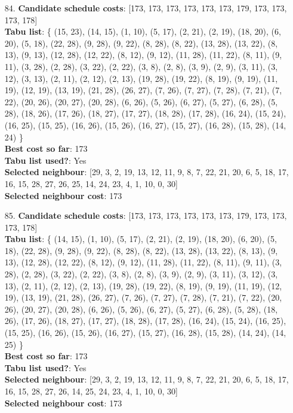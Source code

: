 \documentclass[fleqn]{article}
\begin{document}
\begin{itemize}
    \item[84.] \textbf{Candidate schedule costs}: [173, 173, 173, 173, 173, 173, 179, 173, 173, 173, 178] \\
    \textbf{Tabu list}: \{ (15, 23), (14, 15), (1, 10), (5, 17), (2, 21), (2, 19), (18, 20), (6, 20), (5, 18), (22, 28), (9, 28), (9, 22), (8, 28), (8, 22), (13, 28), (13, 22), (8, 13), (9, 13), (12, 28), (12, 22), (8, 12), (9, 12), (11, 28), (11, 22), (8, 11), (9, 11), (3, 28), (2, 28), (3, 22), (2, 22), (3, 8), (2, 8), (3, 9), (2, 9), (3, 11), (3, 12), (3, 13), (2, 11), (2, 12), (2, 13), (19, 28), (19, 22), (8, 19), (9, 19), (11, 19), (12, 19), (13, 19), (21, 28), (26, 27), (7, 26), (7, 27), (7, 28), (7, 21), (7, 22), (20, 26), (20, 27), (20, 28), (6, 26), (5, 26), (6, 27), (5, 27), (6, 28), (5, 28), (18, 26), (17, 26), (18, 27), (17, 27), (18, 28), (17, 28), (16, 24), (15, 24), (16, 25), (15, 25), (16, 26), (15, 26), (16, 27), (15, 27), (16, 28), (15, 28), (14, 24) \} \\
    \textbf{Best cost so far}: 173 \\
    \textbf{Tabu list used?}: Yes \\
    \textbf{Selected neighbour}: [29, 3, 2, 19, 13, 12, 11, 9, 8, 7, 22, 21, 20, 6, 5, 18, 17, 16, 15, 28, 27, 26, 25, 14, 24, 23, 4, 1, 10, 0, 30] \\
    \textbf{Selected neighbour cost}: 173
      

    \item[85.] \textbf{Candidate schedule costs}: [173, 173, 173, 173, 173, 173, 179, 173, 173, 173, 178] \\
    \textbf{Tabu list}: \{ (14, 15), (1, 10), (5, 17), (2, 21), (2, 19), (18, 20), (6, 20), (5, 18), (22, 28), (9, 28), (9, 22), (8, 28), (8, 22), (13, 28), (13, 22), (8, 13), (9, 13), (12, 28), (12, 22), (8, 12), (9, 12), (11, 28), (11, 22), (8, 11), (9, 11), (3, 28), (2, 28), (3, 22), (2, 22), (3, 8), (2, 8), (3, 9), (2, 9), (3, 11), (3, 12), (3, 13), (2, 11), (2, 12), (2, 13), (19, 28), (19, 22), (8, 19), (9, 19), (11, 19), (12, 19), (13, 19), (21, 28), (26, 27), (7, 26), (7, 27), (7, 28), (7, 21), (7, 22), (20, 26), (20, 27), (20, 28), (6, 26), (5, 26), (6, 27), (5, 27), (6, 28), (5, 28), (18, 26), (17, 26), (18, 27), (17, 27), (18, 28), (17, 28), (16, 24), (15, 24), (16, 25), (15, 25), (16, 26), (15, 26), (16, 27), (15, 27), (16, 28), (15, 28), (14, 24), (14, 25) \} \\
    \textbf{Best cost so far}: 173 \\
    \textbf{Tabu list used?}: Yes \\
    \textbf{Selected neighbour}: [29, 3, 2, 19, 13, 12, 11, 9, 8, 7, 22, 21, 20, 6, 5, 18, 17, 16, 15, 28, 27, 26, 14, 25, 24, 23, 4, 1, 10, 0, 30] \\
    \textbf{Selected neighbour cost}: 173
      


\end{itemize}
\end{document}
